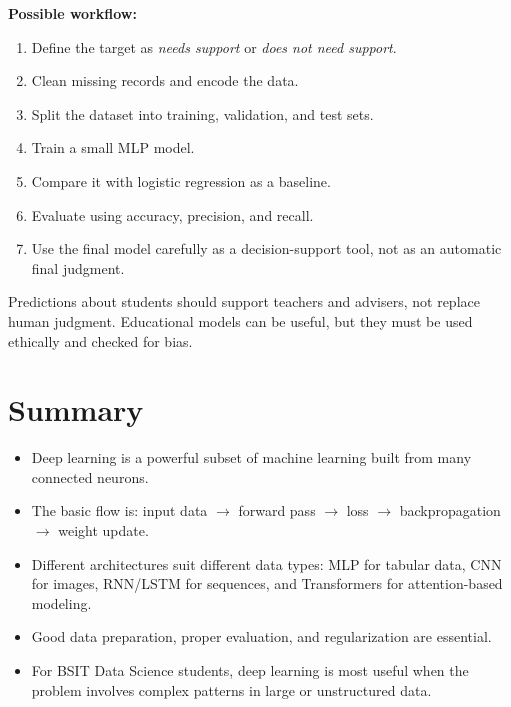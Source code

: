 \documentclass[11pt,a4paper]{article}
\begin{document}
\textbf{Possible workflow:}
\begin{enumerate}[leftmargin=*]
  \item Define the target as \textit{needs support} or \textit{does not need support}.
  \item Clean missing records and encode the data.
  \item Split the dataset into training, validation, and test sets.
  \item Train a small MLP model.
  \item Compare it with logistic regression as a baseline.
  \item Evaluate using accuracy, precision, and recall.
  \item Use the final model carefully as a decision-support tool, not as an automatic final judgment.
\end{enumerate}

\begin{alertbox}
Predictions about students should support teachers and advisers, not replace human judgment. Educational models can be useful, but they must be used ethically and checked for bias.
\end{alertbox}

\section{Summary}

\begin{itemize}[leftmargin=*]
  \item Deep learning is a powerful subset of machine learning built from many connected neurons.
  \item The basic flow is: input data $\rightarrow$ forward pass $\rightarrow$ loss $\rightarrow$ backpropagation $\rightarrow$ weight update.
  \item Different architectures suit different data types: MLP for tabular data, CNN for images, RNN/LSTM for sequences, and Transformers for attention-based modeling.
  \item Good data preparation, proper evaluation, and regularization are essential.
  \item For BSIT Data Science students, deep learning is most useful when the problem involves complex patterns in large or unstructured data.
\end{itemize}
\end{document}
